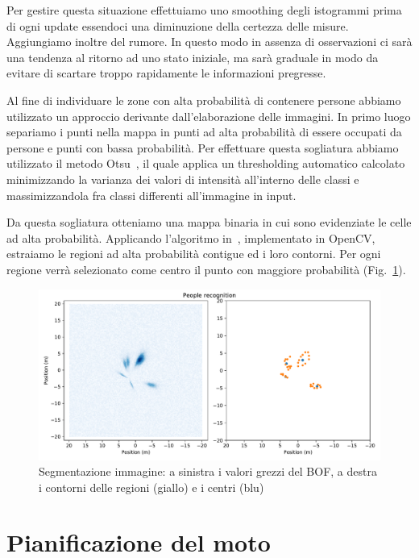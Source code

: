 \documentclass[a4paper]{article}
\begin{document}
	Per gestire questa situazione effettuiamo uno smoothing degli istogrammi
	prima di ogni update essendoci una diminuzione della certezza delle misure.
	Aggiungiamo inoltre del rumore. In questo modo in assenza di osservazioni
	ci sarà una tendenza al ritorno ad uno stato iniziale, ma sarà graduale in
	modo da evitare di scartare troppo rapidamente le informazioni pregresse.

	Al fine di individuare le zone con alta probabilità di contenere persone
	abbiamo utilizzato un approccio derivante dall'elaborazione delle immagini.
	In primo luogo separiamo i punti nella mappa in punti ad alta probabilità
	di essere occupati da persone e punti con bassa probabilità. Per effettuare
	questa sogliatura abbiamo utilizzato il metodo Otsu~\cite{otsu}, il quale
	applica un thresholding automatico calcolato minimizzando la varianza dei
	valori di intensità all'interno delle classi e massimizzandola fra classi
	differenti all'immagine in input.  
	
	Da questa sogliatura otteniamo una mappa binaria in cui sono evidenziate le
	celle ad alta probabilità. Applicando l'algoritmo in~\cite{contours},
	implementato in OpenCV, estraiamo le regioni ad alta probabilità contigue
	ed i loro contorni. Per ogni regione verrà selezionato come centro il punto
	con maggiore probabilità (Fig.~\ref{fig:image_segmentation}).

	\begin{figure}[H]
		\centering
		\includegraphics[width=1\textwidth]{./img/image_segmentation.pdf}
		\caption{Segmentazione immagine: a sinistra i valori grezzi del BOF, a destra i contorni delle regioni (giallo) e i centri (blu) }
		\label{fig:image_segmentation}
	\end{figure}
		
	\section{Pianificazione del moto}\label{sec:Pianificazione-del-moto}
	
\end{document}
